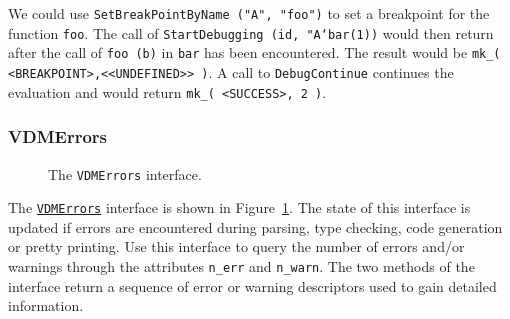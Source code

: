 \documentclass[\pformat,12pt]{article}
\newcommand{\VDMErrors}{\hyperlink{interface.VDMErrors}{VDMErrors}}
\begin{document}
We could use {\tt SetBreakPointByName ("A", "foo")} to set a 
breakpoint for the function {\tt foo}. The call of
{\tt StartDebugging (id, "A`bar(1))} would then return after 
the call of {\tt foo (b)} in {\tt bar} has been encountered.
The result would be {\tt mk\_( <BREAKPOINT>,<<UNDEFINED>> )}.
A call to {\tt DebugContinue} continues the evaluation and
would return {\tt mk\_( <SUCCESS>, 2 )}.

\subsubsection{VDMErrors}
\label{VDMErrors}

\begin{figure}[tbh]
\begin{center}
\mbox{}
\caption{The {\tt VDMErrors} interface.}\label{fig:VDMErrors}
\end{center}
\end{figure}


The {\tt \VDMErrors} interface is shown in Figure~\ref{fig:VDMErrors}.
The state of this interface is updated if errors are encountered
during parsing, type checking, code generation or pretty printing. Use
this interface to query the number of errors and/or warnings through
the attributes {\tt n\_err} and {\tt n\_warn}. The two methods of the
interface return a sequence of error or warning descriptors used to
gain detailed information.
\end{document}
